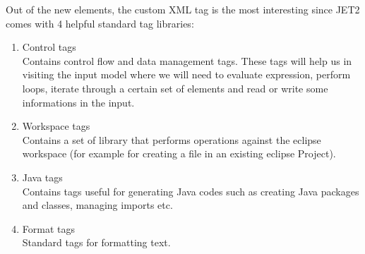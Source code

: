 Out of the new elements, the custom XML tag is the most interesting since JET2 comes with 4 helpful standard tag libraries\cite{JET2TAGS}:
\begin{enumerate}
	\item Control tags\\
		    Contains control flow and data management tags. These tags will help us in visiting the input model where we will need to evaluate expression, perform loops,  iterate through a certain set of elements and read or write some informations in the input. 
	\item Workspace tags\\
			  Contains a set of library that performs operations against the eclipse workspace (for example for creating a file in an existing eclipse Project). 
	\item Java tags\\
				Contains tags useful for generating Java codes such as creating Java packages and classes, managing imports etc.
	\item Format tags\\
		    Standard tags for formatting text. 
\end{enumerate}

